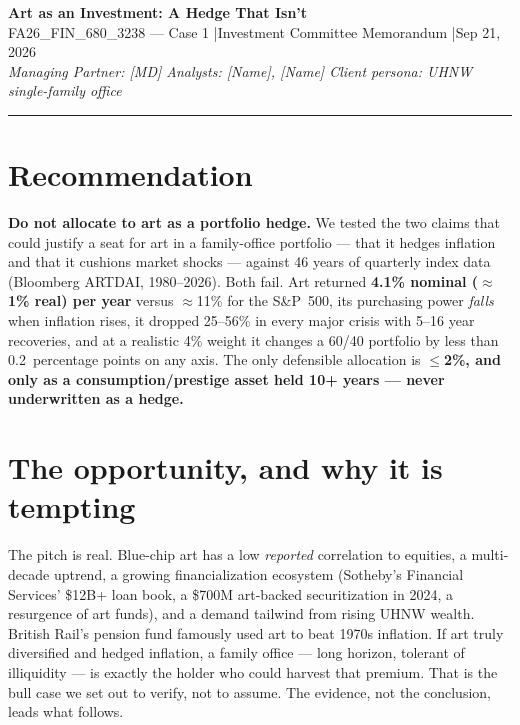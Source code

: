 \documentclass[11pt]{article}
\begin{document}
\begin{center}
{\large\bfseries Art as an Investment: A Hedge That Isn't}\\[2pt]
{\small FA26\_FIN\_680\_3238 --- Case 1 \quad|\quad Investment Committee Memorandum \quad|\quad Sep 21, 2026}\\[2pt]
{\small\itshape Managing Partner: [MD] \quad Analysts: [Name], [Name] \quad Client persona: UHNW single-family office}
\end{center}
\vspace{-4pt}
\hrule
\vspace{6pt}

\section*{Recommendation}
\textbf{Do not allocate to art as a portfolio hedge.} We tested the two claims that could justify a
seat for art in a family-office portfolio --- that it hedges inflation and that it cushions market
shocks --- against 46 years of quarterly index data (Bloomberg ARTDAI, 1980--2026). Both fail. Art
returned \textbf{4.1\% nominal (\(\approx\)1\% real) per year} versus \(\approx\)11\% for the S\&P~500,
its purchasing power \emph{falls} when inflation rises, it dropped 25--56\% in every major crisis with
5--16 year recoveries, and at a realistic 4\% weight it changes a 60/40 portfolio by less than
0.2~percentage points on any axis. The only defensible allocation is \textbf{$\le$2\%, and only as a
consumption/prestige asset held 10+ years --- never underwritten as a hedge.}

\section{The opportunity, and why it is tempting}
The pitch is real. Blue-chip art has a low \emph{reported} correlation to equities, a multi-decade
uptrend, a growing financialization ecosystem (Sotheby's Financial Services' \$12B+ loan book, a
\$700M art-backed securitization in 2024, a resurgence of art funds), and a demand tailwind from
rising UHNW wealth. British Rail's pension fund famously used art to beat 1970s inflation. If art
truly diversified and hedged inflation, a family office --- long horizon, tolerant of illiquidity ---
is exactly the holder who could harvest that premium. That is the bull case we set out to verify, not
to assume. The evidence, not the conclusion, leads what follows.
\end{document}
